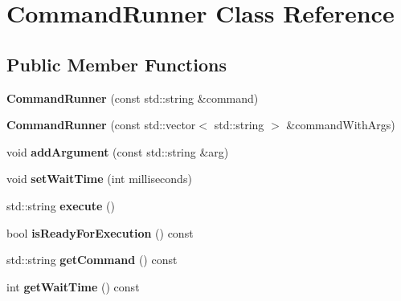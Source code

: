 \hypertarget{classCommandRunner}{\section{Command\-Runner Class Reference}
\label{classCommandRunner}
}
\subsection*{Public Member Functions}
\begin{DoxyCompactItemize}
\item 
\hypertarget{classCommandRunner_a9e642e4704b083084100ded9357e098a}{{\bfseries Command\-Runner} (const std\-::string \&command)}\label{classCommandRunner_a9e642e4704b083084100ded9357e098a}

\item 
\hypertarget{classCommandRunner_a253f130e48e007bfef6160e4907f25a9}{{\bfseries Command\-Runner} (const std\-::vector$<$ std\-::string $>$ \&command\-With\-Args)}\label{classCommandRunner_a253f130e48e007bfef6160e4907f25a9}

\item 
\hypertarget{classCommandRunner_aa9f4aec533d160749766ae4d27b5fca5}{void {\bfseries add\-Argument} (const std\-::string \&arg)}\label{classCommandRunner_aa9f4aec533d160749766ae4d27b5fca5}

\item 
\hypertarget{classCommandRunner_a962a39f1d12393211becfbf7f0ae123f}{void {\bfseries set\-Wait\-Time} (int milliseconds)}\label{classCommandRunner_a962a39f1d12393211becfbf7f0ae123f}

\item 
\hypertarget{classCommandRunner_a75a0a138a720cf56f94409f78891c4b0}{std\-::string {\bfseries execute} ()}\label{classCommandRunner_a75a0a138a720cf56f94409f78891c4b0}

\item 
\hypertarget{classCommandRunner_a6e22a52434faa6cc419ae26e539006b7}{bool {\bfseries is\-Ready\-For\-Execution} () const }\label{classCommandRunner_a6e22a52434faa6cc419ae26e539006b7}

\item 
\hypertarget{classCommandRunner_ade72368d3f9f783fc3535d992491ad97}{std\-::string {\bfseries get\-Command} () const }\label{classCommandRunner_ade72368d3f9f783fc3535d992491ad97}

\item 
\hypertarget{classCommandRunner_afab3f2ed4515ce903fc489c16d07bf5b}{int {\bfseries get\-Wait\-Time} () const }\label{classCommandRunner_afab3f2ed4515ce903fc489c16d07bf5b}

\end{DoxyCompactItemize}
